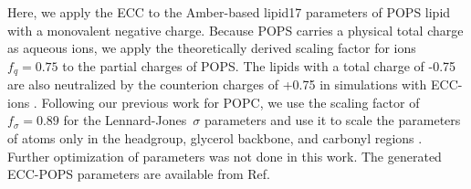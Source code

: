 \documentclass[journal=jpcbfk,manuscript=article]{achemso}
\begin{document}
Here, we apply the ECC to the Amber-based lipid17 parameters \cite{lipid17-future} of POPS lipid with a monovalent negative charge.
Because POPS carries a physical total charge as aqueous ions, we apply the theoretically derived scaling factor for
ions $f_q = 0.75$ \cite{leontyev09} to the partial charges of POPS. 
The lipids with a total charge of -0.75 are also neutralized
by the counterion charges of +0.75 in simulations with ECC-ions \cite{Pluharova2014, kohagen16, martinek17}.
Following our previous work for POPC, we use the scaling factor of $f_\sigma = 0.89$ for the Lennard-Jones~$\sigma$ parameters and
use it to scale the parameters of atoms only in the headgroup, glycerol backbone, and carbonyl regions \cite{melcr18}.
Further optimization of parameters was not done in this work. 
The generated ECC-POPS parameters are available from Ref.~
\end{document}
